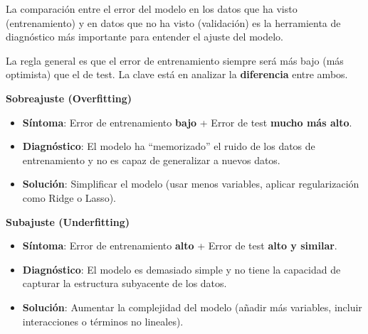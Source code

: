 \documentclass[
  letterpaper,
  DIV=11,
  numbers=noendperiod]{scrreprt}
\providecommand{\tightlist}{%
  \setlength{\itemsep}{0pt}\setlength{\parskip}{0pt}}
\begin{document}
\begin{tcolorbox}[enhanced jigsaw, leftrule=.75mm, breakable, colbacktitle=quarto-callout-important-color!10!white, bottomrule=.15mm, colframe=quarto-callout-important-color-frame, toprule=.15mm, colback=white, coltitle=black, bottomtitle=1mm, left=2mm, title=\textcolor{quarto-callout-important-color}{\faExclamation}\hspace{0.5em}{Interpretando el Error}, opacityback=0, arc=.35mm, opacitybacktitle=0.6, toptitle=1mm, titlerule=0mm, rightrule=.15mm]

La comparación entre el error del modelo en los datos que ha visto
(entrenamiento) y en datos que no ha visto (validación) es la
herramienta de diagnóstico más importante para entender el ajuste del
modelo.

La regla general es que el error de entrenamiento siempre será más bajo
(más optimista) que el de test. La clave está en analizar la
\textbf{diferencia} entre ambos.

\textbf{Sobreajuste (Overfitting)}

\begin{itemize}
\tightlist
\item
  \textbf{Síntoma}: Error de entrenamiento \textbf{bajo} + Error de test
  \textbf{mucho más alto}.
\item
  \textbf{Diagnóstico}: El modelo ha ``memorizado'' el ruido de los
  datos de entrenamiento y no es capaz de generalizar a nuevos datos.
\item
  \textbf{Solución}: Simplificar el modelo (usar menos variables,
  aplicar regularización como Ridge o Lasso).
\end{itemize}

\textbf{Subajuste (Underfitting)}

\begin{itemize}
\tightlist
\item
  \textbf{Síntoma}: Error de entrenamiento \textbf{alto} + Error de test
  \textbf{alto y similar}.
\item
  \textbf{Diagnóstico}: El modelo es demasiado simple y no tiene la
  capacidad de capturar la estructura subyacente de los datos.
\item
  \textbf{Solución}: Aumentar la complejidad del modelo (añadir más
  variables, incluir interacciones o términos no lineales).
\end{itemize}

\end{tcolorbox}
\end{document}
